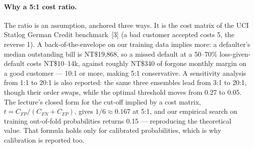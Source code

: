\documentclass{article}
\begin{document}
\paragraph{Why a 5:1 cost ratio.}
The ratio is an assumption, anchored three ways. It is the cost matrix of the UCI
Statlog German Credit benchmark~[3] (a bad customer accepted costs 5, the reverse
1). A back-of-the-envelope on our training data implies more: a defaulter's median
outstanding bill is NT\$19,868, so a missed default at a 50--70\%
loss-given-default costs NT\$10--14k, against roughly NT\$340 of forgone monthly
margin on a good customer --- 10:1 or more, making 5:1 conservative. A sensitivity
analysis from 1:1 to 20:1 is also reported: the same three ensembles lead from 3:1
to 20:1, though their order swaps, while the optimal threshold moves from 0.27 to
0.05. The lecture's closed form for the cut-off implied by a
cost matrix, $t = C_{FP}/(C_{FN}+C_{FP})$, gives $1/6 \approx 0.167$ at 5:1, and
our empirical search on training out-of-fold probabilities returns 0.15 ---
reproducing the theoretical value. That formula holds only for calibrated
probabilities, which is why calibration is reported too.
\end{document}
